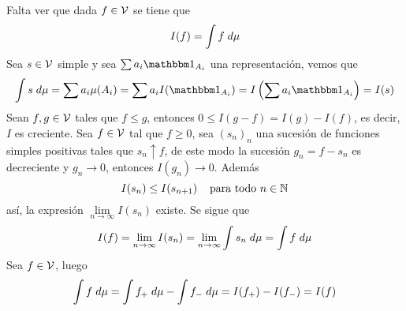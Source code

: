 \documentclass{article}
\begin{document}
\begin{enumerate}
    \vspace{4mm}
    \noindent Falta ver que dada $f\in\mathcal{V}$ se tiene que
    \begin{equation*}
        I(f)=\int f\hspace{1mm}d\mu
    \end{equation*}
    Sea $s\in\mathcal{V}$ simple y sea $\sum a_{i}\I_{A_{i}}$ una representación, vemos que
    \begin{equation*}
        \int s\hspace{1mm}d\mu=\sum a_{i}\mu(A_{i})=\sum a_{i}I(\I_{A_{i}})
        =I\left(\sum a_{i}\I_{A_{i}}\right)=I(s)
    \end{equation*}
    Sean $f,g\in\mathcal{V}$ tales que $f\leq g$, entonces $0\leq I(g-f)=I(g)-I(f)$, es decir, $I$ es 
    creciente. Sea $f\in\mathcal{V}$ tal que $f\geq0$, sea $(s_{n})_{n}$ una sucesión de funciones simples 
    positivas tales que $s_{n}\uparrow f$, de este modo la sucesión $g_{n}=f-s_{n}$ es decreciente 
    y $g_{n}\to0$, entonces $I(g_{n})\to0$. Además
    \begin{equation*}
        I(s_{n})\leq I(s_{n+1})\hspace{4mm}\text{para todo }n\in\mathbb{N}
    \end{equation*}
    así, la expresión $\lim\limits_{n\to\infty}I(s_{n})$ existe. Se sigue que
    \begin{equation*}
        I(f)=\lim\limits_{n\to\infty}I(s_{n})=\lim\limits_{n\to\infty}\int s_{n}\hspace{1mm}d\mu
        =\int f\hspace{1mm}d\mu
    \end{equation*}
    Sea $f\in\mathcal{V}$, luego
    \begin{equation*}
        \int f\hspace{1mm}d\mu=\int f_{+}\hspace{1mm}d\mu-\int f_{-}\hspace{1mm}d\mu
        =I(f_{+})-I(f_{-})=I(f)
    \end{equation*}
\end{enumerate}

\end{document}
